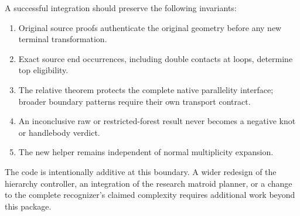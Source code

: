 A successful integration should preserve the following invariants:
\begin{enumerate}
\item Original source proofs authenticate the original geometry before any
new terminal transformation.
\item Exact source end occurrences, including double contacts at loops,
determine top eligibility.
\item The relative theorem protects the complete native parallelity
interface; broader boundary patterns require their own transport contract.
\item An inconclusive raw or restricted-forest result never becomes a
negative knot or handlebody verdict.
\item The new helper remains independent of normal multiplicity expansion.
\end{enumerate}

The code is intentionally additive at this boundary. A wider redesign of
the hierarchy controller, an integration of the research matroid planner,
or a change to the complete recognizer's claimed complexity requires
additional work beyond this package.
